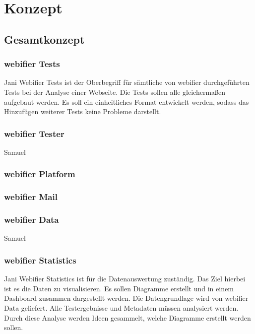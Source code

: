 \chapter{Konzept}

\section{Gesamtkonzept}

\subsection{webifier Tests}

\todo Jani
Webifier Tests ist der Oberbegriff für sämtliche von webifier durchgeführten Tests bei der Analyse einer Webseite. Die Tests sollen alle gleichermaßen aufgebaut werden. Es soll ein einheitliches Format entwickelt werden, sodass das Hinzufügen weiterer Tests keine Probleme darstellt.

\subsection{webifier Tester}

\todo Samuel

\subsection{webifier Platform}


\subsection{webifier Mail}


\subsection{webifier Data}

\todo Samuel

\subsection{webifier Statistics}

\todo Jani
Webifier Statistics ist für die Datenauswertung zuständig. Das Ziel hierbei ist es die Daten zu visualisieren. Es sollen Diagramme erstellt und in einem Dashboard zusammen dargestellt werden. Die Datengrundlage wird von webifier Data geliefert. Alle Testergebnisse und Metadaten müssen analysiert werden. Durch diese Analyse werden Ideen gesammelt, welche Diagramme erstellt werden sollen.

